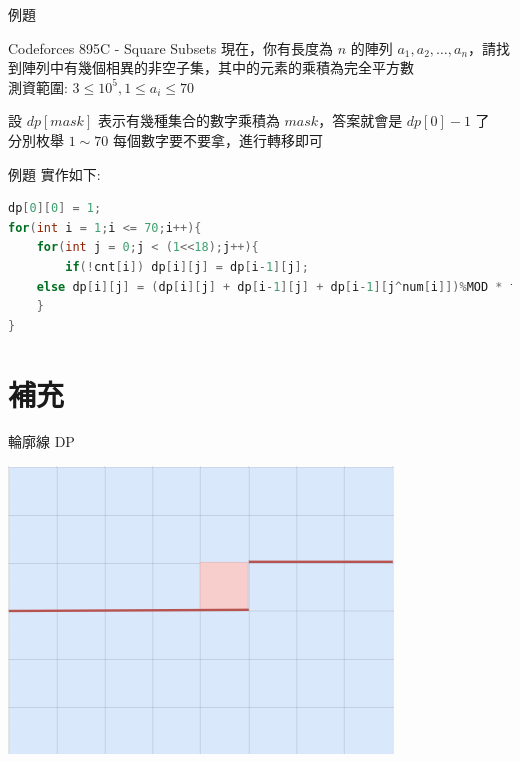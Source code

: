 \documentclass[aspectratio=169]{beamer}
\begin{document}
\begin{frame}{例題}
    \begin{block}{Codeforces 895C - Square Subsets}
        現在，你有長度為 $n$ 的陣列 $a_1,a_2,\dots,a_n$，請找到陣列中有幾個相異的非空子集，其中的元素的乘積為完全平方數\\ 
        \vspace{5mm}
        測資範圍: $3 \le 10^5, 1 \le a_i \le 70$
    \end{block} 
    設 $dp[mask]$ 表示有幾種集合的數字乘積為 $mask$，答案就會是 $dp[0] - 1$ 了 \\
    分別枚舉 $1 \sim 70$ 每個數字要不要拿，進行轉移即可
\end{frame}

\begin{frame}[fragile]{例題}
    實作如下:
    \begin{lstlisting}[language=C++]
dp[0][0] = 1;
for(int i = 1;i <= 70;i++){
    for(int j = 0;j < (1<<18);j++){
        if(!cnt[i]) dp[i][j] = dp[i-1][j];
    else dp[i][j] = (dp[i][j] + dp[i-1][j] + dp[i-1][j^num[i]])%MOD * fastpow(2,cnt[i]-1)%MOD;
    }
}
    \end{lstlisting}
\end{frame}

\section{補充}

\begin{frame}{輪廓線 DP}
    \begin{center}
        \includegraphics[scale=0.8]{images/DP on Broken Profile.png}
    \end{center}
\end{frame}
\end{document}
